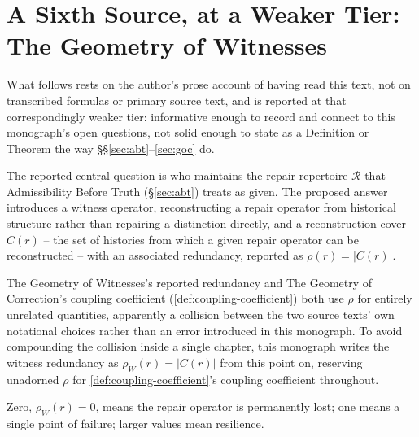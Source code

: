 \section{A Sixth Source, at a Weaker Tier: The Geometry of Witnesses}
\label{sec:witnesses}


What follows rests on the author's prose account of having read this
text, not on transcribed formulas or primary source text, and is
reported at that correspondingly weaker tier: informative enough to
record and connect to this monograph's open questions, not solid enough
to state as a Definition or Theorem the way \S\S\ref{sec:abt}--\ref{sec:goc}
do.

The reported central question is who maintains the repair repertoire
$\mathcal{R}$ that Admissibility Before Truth (\S\ref{sec:abt}) treats as
given. The proposed answer introduces a witness operator, reconstructing
a repair operator from historical structure rather than repairing a
distinction directly, and a reconstruction cover $C(r)$ -- the set of
histories from which a given repair operator can be reconstructed -- with
an associated redundancy, reported as $\rho(r) = |C(r)|$.

\begin{remark}
\label{rem:rho-collision}
The Geometry of Witnesses's reported redundancy and The Geometry of
Correction's coupling coefficient (\cref{def:coupling-coefficient}) both
use $\rho$ for entirely unrelated quantities, apparently a collision
between the two source texts' own notational choices rather than an
error introduced in this monograph. To avoid compounding the collision
inside a single chapter, this monograph writes the witness redundancy as
$\rho_W(r) = |C(r)|$ from this point on, reserving unadorned $\rho$ for
\cref{def:coupling-coefficient}'s coupling coefficient throughout.
\end{remark}

Zero, $\rho_W(r) = 0$, means the repair operator is permanently lost; one
means a single point of failure; larger values mean resilience.

